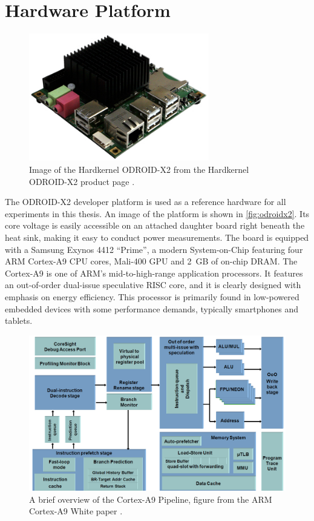 \section{Hardware Platform}
\label{sec:hw}

\begin{figure}[bth]
    \centering
    \includegraphics[width=0.7\textwidth]{figs/odroid.jpg}
    \caption{Image of the Hardkernel ODROID-X2 from the Hardkernel ODROID-X2
    product page \cite{hardkernelodroidx2}.}
    \label{fig:odroidx2}
\end{figure}

The ODROID-X2 developer platform \cite{hardkernelodroidx2} is used as a
reference hardware for all experiments in this thesis. An image of the platform
is shown in \autoref{fig:odroidx2}. Its core voltage is easily accessible on an
attached daughter board right beneath the heat sink, making it easy to conduct
power measurements. The board is equipped with a Samsung Exynos 4412 ``Prime'',
a modern System-on-Chip featuring four ARM Cortex-A9 CPU cores, Mali-400 GPU and
2~GB of on-chip DRAM. The Cortex-A9 is one of ARM's mid-to-high-range application
processors. It features an out-of-order dual-issue speculative RISC core, and it
is clearly designed with emphasis on energy efficiency. This processor is
primarily found in low-powered embedded devices with some performance demands,
typically smartphones and tablets.

\begin{figure}[bht]
    \centering
    \includegraphics[width=\textwidth]{figs/A9-Pipeline-hres.jpg}
    \caption{A brief overview of the Cortex-A9 Pipeline, figure from the ARM
    Cortex-A9 White paper \cite{a9whitepaper}.}
    \label{fig:a9arch}
\end{figure}

